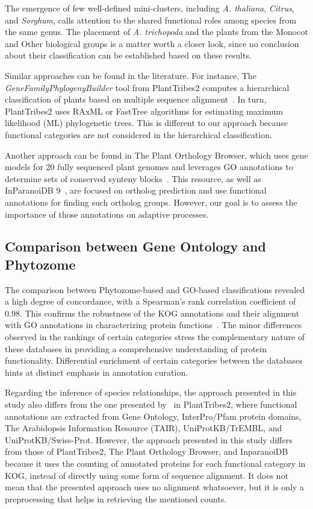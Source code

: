 The emergence of few well-defined mini-clusters, including 
\emph{A. thaliana}, \emph{Citrus}, and \emph{Sorghum}, 
calls attention to the shared functional roles among 
species from the same genus. The placement of 
\emph{A. trichopoda} and the plants from the Monocot and 
Other biological groups is a matter worth a closer look, 
since no conclusion about their classification can be 
established based on these results.

Similar approaches can be found in the literature. For 
instance, The \emph{GeneFamilyPhylogenyBuilder} tool from 
PlantTribes2 computes a hierarchical classification of 
plants based on multiple sequence 
alignment~\citep{wafula2023}. In turn, PlantTribes2 uses 
RAxML or FastTree 
algorithms for estimating maximum likelihood (ML) 
phylogenetic trees. This is different to our approach 
because functional categories are not considered in the 
hierarchical classification.

Another approach can be found in The Plant Orthology Browser, 
which uses gene models for 20 fully sequenced plant genomes 
and leverages GO annotations to determine sets of conserved 
synteny blocks~\citep{tulpan2017}. This resource, as well as
InParanoiDB 9~\citep{persson2023}, are focused on ortholog 
prediction and use functional annotations for finding such 
ortholog groups. However, our goal is to assess the 
importance of those annotations on adaptive processes.


\subsection{Comparison between Gene Ontology and Phytozome}
\label{sec:conclusion.comparison}

The comparison between Phytozome-based and GO-based 
classifications revealed a high degree of concordance, 
with a Spearman's rank correlation coefficient of 0.98. 
This confirms the robustness of the KOG annotations and 
their alignment with GO annotations in characterizing 
protein functions~\citep{tatusov2003}. 
The minor differences observed in the 
rankings of certain categories stress the complementary 
nature of these databases in providing a comprehensive 
understanding of protein functionality. Differential 
enrichment of certain categories between the databases 
hints at distinct emphasis in annotation curation.

Regarding the inference of species relationships, the 
approach presented in this study also differs from the one 
presented by~\cite{wafula2023} in PlantTribes2, where 
functional annotations are extracted from Gene Ontology, 
InterPro/Pfam protein domains, The Arabidopsis Information 
Resource (TAIR), UniProtKB/TrEMBL, and UniProtKB/Swiss-Prot.
However, the approach presented in this study differs from 
those of PlantTribes2, The Plant Orthology Browser, and 
InparanoiDB because it uses the counting of annotated proteins 
for each functional category in KOG, instead of directly using 
some form of sequence alignment. It does not mean that the 
presented approach uses no alignment whatsoever, but it is only 
a preprocessing that helps in retrieving the mentioned counts.



